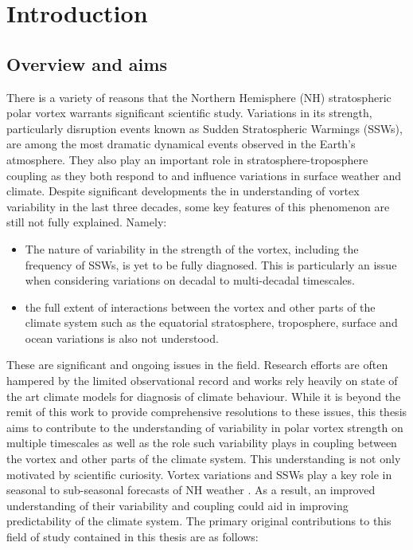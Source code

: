 \chapter{Introduction}
\label{cha:intro}

\section{Overview and aims}
\label{sec:overview}

There is a variety of reasons that the Northern Hemisphere (NH) stratospheric polar vortex warrants significant scientific study. Variations in its strength, particularly disruption events known as Sudden Stratospheric Warmings (SSWs), are among the most dramatic dynamical events observed in the Earth's atmosphere. They also play an important role in stratosphere-troposphere coupling as they both respond to and influence variations in surface weather and climate. Despite significant developments the in understanding of vortex variability in the last three decades, some key features of this phenomenon are still not fully explained. Namely: 

\begin{itemize}
    \item The nature of variability in the strength of the vortex, including the frequency of SSWs, is yet to be fully diagnosed. This is particularly an issue when considering variations on decadal to multi-decadal timescales.  
    
    \item the full extent of interactions between the vortex and other parts of the climate system such as the equatorial stratosphere, troposphere, surface and ocean variations is also not understood. 
\end{itemize}

These are significant and ongoing issues in the field. Research efforts are often hampered by the limited observational record and works rely heavily on state of the art climate models for diagnosis of climate behaviour. While it is beyond the remit of this work to provide comprehensive resolutions to these issues, this thesis aims to contribute to the understanding of variability in polar vortex strength on multiple timescales as well as the role such variability plays in coupling between the vortex and other parts of the climate system. This understanding is not only motivated by scientific curiosity. Vortex variations and SSWs play a key role in seasonal to sub-seasonal forecasts of NH weather \citep{scaifeSeasonal2016}. As a result, an improved understanding of their variability and coupling could aid in improving predictability of the climate system. The primary original contributions to this field of study contained in this thesis are as follows:

